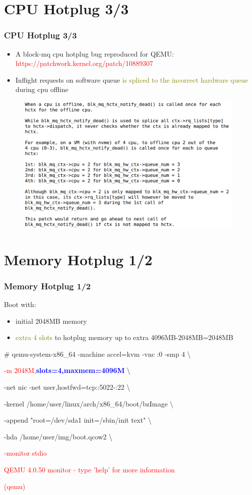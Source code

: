 \documentclass[aspectratio=169]{beamer}
\begin{document}
\section{CPU Hotplug 3/3}
\begin{frame}
\frametitle{CPU Hotplug 3/3}
\footnotesize
\begin{itemize}
\item A block-mq cpu hotplug bug reproduced for QEMU: \textcolor{red}{https://patchwork.kernel.org/patch/10889307}
\item Inflight requests on software queue \textcolor{olive}{is spliced to the incorrect hardware queue} during cpu offline
\end{itemize}
\begin{figure}
\includegraphics[width=0.6\linewidth]{figures/blk-cpu.pdf}
\end{figure}
\end{frame}



\section{Memory Hotplug 1/2}
\begin{frame}
\frametitle{Memory Hotplug 1/2}
Boot with:
\begin{itemize}
\item initial 2048MB memory
\item \textcolor{olive}{extra 4 slots} to hotplug memory up to extra 4096MB-2048MB=2048MB
\end{itemize}
\begin{block}{}

\# qemu-system-x86\_64 -machine accel=kvm -vnc :0 -smp 4 \textbackslash

\textcolor{red}{-m 2048M,\textbf{\textcolor{blue}{slots=4,maxmem=4096M}}} \textbackslash

-net nic -net user,hostfwd=tcp::5022-:22 \textbackslash

-kernel /home/user/linux/arch/x86\_64/boot/bzImage \textbackslash
	
-append "root=/dev/sda1 init=/sbin/init text" \textbackslash

-hda /home/user/img/boot.qcow2 \textbackslash

\textcolor{red}{-monitor stdio}

\textcolor{red}{QEMU 4.0.50 monitor - type 'help' for more information}

\textcolor{red}{(qemu)}
\end{block}
\end{frame}
\end{document}
